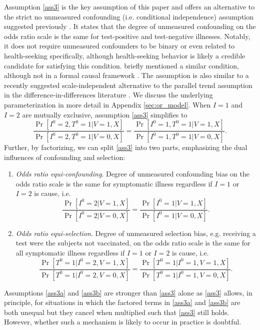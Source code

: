 \documentclass[11pt]{article}
\begin{document}
Assumption \ref{ass3} is the key assumption of this paper and offers an alternative to the strict no unmeasured confounding (i.e. conditional independence) assumption suggested previously \cite{schnitzer_estimands_2022}. It states that the degree of unmeasured confounding on the odds ratio scale is the same for test-positive and test-negative illnesses. Notably, it does not require unmeasured confounders to be binary or even related to health-seeking specifically, although health-seeking behavior is likely a credible candidate for satisfying this condition. \citeauthor{lewnard_measurement_2018} briefly mentioned a similar condition, although not in a formal causal framework \cite{lewnard_measurement_2018}. The assumption is also similar to a recently suggested scale-independent alternative to the parallel trend assumption in the difference-in-differences literature \cite{park_universal_2023,tchetgen_universal_2023}. We discuss the underlying parameterization in more detail in Appendix \ref{sec:or_model}. When $I = 1$ and $I = 2$ are mutually exclusive, assumption  \ref{ass3} simplifies to
\begin{equation}\label{eqn:a3_simplified}
    \frac{\Pr[I^0 = 2, T^0 = 1 | V = 1, X]}{\Pr[I^0 = 2, T^0 = 1 | V = 0, X]} =\frac{\Pr[I^0 = 1, T^0 = 1 | V = 1, X]}{\Pr[I^0 = 1, T^0 = 1 | V = 0, X]}.
\end{equation}
Further, by factorizing, we can split \ref{ass3} into two parts, emphasizing the dual influences of confounding and selection:
\begin{enumerate}[label=\upshape(A3\alph*), ref=A3\alph*]
    \item\label{ass3a}  \textit{Odds ratio equi-confounding}. Degree of unmeasured confounding bias on the odds ratio scale is the same for symptomatic illness regardless if $I=1$ or $I=2$ is cause, i.e. 
    $$\frac{\Pr[I^0 = 2 | V = 1, X]}{\Pr[I^0 = 2 | V = 0, X]} =\frac{\Pr[I^0 = 1 | V = 1, X]}{\Pr[I^0 = 1 | V = 0, X]}.$$
    \item\label{ass3b} \textit{Odds ratio equi-selection}. Degree of unmeasured selection bias, e.g. receiving a test were the subjects not vaccinated, on the odds ratio scale is the same for all symptomatic illness regardless if $I=1$ or $I=2$ is cause, i.e. 
    $$\frac{\Pr[T^0 = 1 | I^0 = 2, V = 1, X]}{\Pr[T^0 = 1 | I^0 = 2, V = 0, X]} =\frac{\Pr[T^0 = 1 | I^0 = 1, V = 1, X]}{\Pr[T^0 = 1 | I^0 = 1, V = 0, X]}.$$
\end{enumerate}
Assumptions \ref{ass3a} and \ref{ass3b} are stronger than \ref{ass3} alone as \ref{ass3} allows, in principle, for situations in which the factored terms in \ref{ass3a} and \ref{ass3b} are both unequal but they cancel when multiplied such that \ref{ass3} still holds. However, whether such a mechanism is likely to occur in practice is doubtful.
\end{document}
